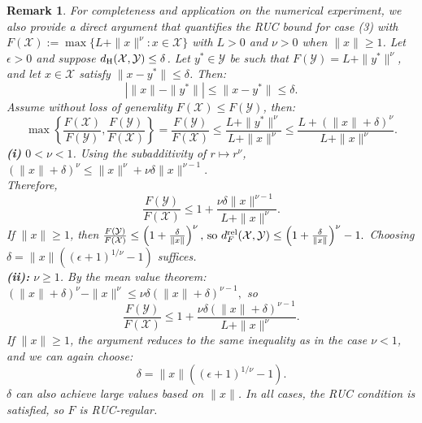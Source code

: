 \documentclass{article}
\newtheorem{remark}[theorem]{Remark}
\newcommand{\cX}{\mathcal{X}}
\newcommand{\cY}{\mathcal{Y}}
\begin{document}
\begin{remark}
For completeness and application on the numerical experiment, we also provide a direct argument that quantifies the
RUC bound for case (3) with \( F(\cX) := \max\{L + \|x\|^\nu : x \in \cX\} \) with \( L > 0 \) and \( \nu > 0 \) when $\|x\|\ge1$. Let \( \epsilon > 0 \) and suppose \( d_{\rm H}(\cX, \cY) \leq \delta \). Let \( y^* \in \cY \) be such that \( F(\cY) = L + \|y^*\|^\nu \), and let \( x \in \cX \) satisfy \( \|x - y^*\| \leq \delta \). Then: \[ \left| \|x\| - \|y^*\| \right| \leq \|x - y^*\| \leq \delta. \] Assume without loss of generality \( F(\cX) \leq F(\cY) \), then: \begin{equation} \label{prop:power-1} \max\left\{ \frac{F(\cX)}{F(\cY)}, \frac{F(\cY)}{F(\cX)} \right\} = \frac{F(\cY)}{F(\cX)}\leq \frac{L+\|y^*\|^\nu}{L+\|x\|^\nu}\leq\frac{L+(\|x\|+\delta)^\nu}{L+\|x\|^\nu}. \end{equation} \textbf{(i)} \( 0 < \nu < 1 \). Using the subadditivity of \( r \mapsto r^\nu \), \( (\|x\| + \delta)^\nu \leq \|x\|^\nu + \nu \delta \|x\|^{\nu - 1}. \)\\Therefore, \[ \frac{F(\cY)}{F(\cX)} \leq 1 + \frac{\nu \delta \|x\|^{\nu - 1}}{L + \|x\|^\nu}. \] If \( \|x\| \geq 1 \), then \(\frac{F(\cY)}{F(\cX)} \leq \left(1 + \frac{\delta}{\|x\|}\right)^\nu, \, \text{so} \,\, d_{F}^{\rm rel}(\cX,\cY) \leq \left(1 + \frac{\delta}{\|x\|} \right)^\nu - 1. \) Choosing \( \delta = \|x\|\left((\epsilon + 1)^{1/\nu} - 1\right) \) suffices.\\ \textbf{(ii):} \( \nu \geq 1 \). By the mean value theorem: \( (\|x\| + \delta)^\nu - \|x\|^\nu \leq \nu \delta (\|x\| + \delta)^{\nu - 1}, \) so \[ \frac{F(\cY)}{F(\cX)} \leq 1 + \frac{\nu \delta (\|x\| + \delta)^{\nu - 1}}{L + \|x\|^\nu}. \] If \( \|x\| \geq 1 \), the argument reduces to the same inequality as in the case \( \nu < 1 \), and we can again choose: \[ \delta = \|x\|\left((\epsilon + 1)^{1/\nu} - 1\right). \] $\delta$ can also achieve large values based on $\|x\|$. In all cases, the RUC condition is satisfied, so \( F \) is RUC-regular.
\end{remark}
\end{document}
